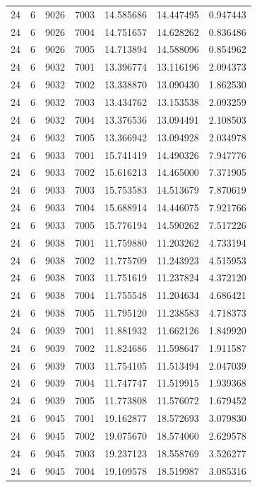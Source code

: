 \begin{table}
\begin{tabular}{rrrrrrr}
24 & 6 & 9026 & 7003 & 14.585686 & 14.447495 & 0.947443 \\
24 & 6 & 9026 & 7004 & 14.751657 & 14.628262 & 0.836486 \\
24 & 6 & 9026 & 7005 & 14.713894 & 14.588096 & 0.854962 \\
24 & 6 & 9032 & 7001 & 13.396774 & 13.116196 & 2.094373 \\
24 & 6 & 9032 & 7002 & 13.338870 & 13.090430 & 1.862530 \\
24 & 6 & 9032 & 7003 & 13.434762 & 13.153538 & 2.093259 \\
24 & 6 & 9032 & 7004 & 13.376536 & 13.094491 & 2.108503 \\
24 & 6 & 9032 & 7005 & 13.366942 & 13.094928 & 2.034978 \\
24 & 6 & 9033 & 7001 & 15.741419 & 14.490326 & 7.947776 \\
24 & 6 & 9033 & 7002 & 15.616213 & 14.465000 & 7.371905 \\
24 & 6 & 9033 & 7003 & 15.753583 & 14.513679 & 7.870619 \\
24 & 6 & 9033 & 7004 & 15.688914 & 14.446075 & 7.921766 \\
24 & 6 & 9033 & 7005 & 15.776194 & 14.590262 & 7.517226 \\
24 & 6 & 9038 & 7001 & 11.759880 & 11.203262 & 4.733194 \\
24 & 6 & 9038 & 7002 & 11.775709 & 11.243923 & 4.515953 \\
24 & 6 & 9038 & 7003 & 11.751619 & 11.237824 & 4.372120 \\
24 & 6 & 9038 & 7004 & 11.755548 & 11.204634 & 4.686421 \\
24 & 6 & 9038 & 7005 & 11.795120 & 11.238583 & 4.718373 \\
24 & 6 & 9039 & 7001 & 11.881932 & 11.662126 & 1.849920 \\
24 & 6 & 9039 & 7002 & 11.824686 & 11.598647 & 1.911587 \\
24 & 6 & 9039 & 7003 & 11.754105 & 11.513494 & 2.047039 \\
24 & 6 & 9039 & 7004 & 11.747747 & 11.519915 & 1.939368 \\
24 & 6 & 9039 & 7005 & 11.773808 & 11.576072 & 1.679452 \\
24 & 6 & 9045 & 7001 & 19.162877 & 18.572693 & 3.079830 \\
24 & 6 & 9045 & 7002 & 19.075670 & 18.574060 & 2.629578 \\
24 & 6 & 9045 & 7003 & 19.237123 & 18.558769 & 3.526277 \\
24 & 6 & 9045 & 7004 & 19.109578 & 18.519987 & 3.085316 \\

\end{tabular}
\end{table}
